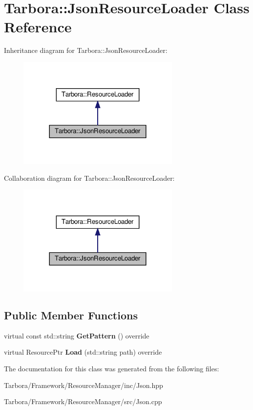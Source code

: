 \hypertarget{classTarbora_1_1JsonResourceLoader}{}\section{Tarbora\+:\+:Json\+Resource\+Loader Class Reference}
\label{classTarbora_1_1JsonResourceLoader}


Inheritance diagram for Tarbora\+:\+:Json\+Resource\+Loader\+:\nopagebreak
\begin{figure}[H]
\begin{center}
\leavevmode
\includegraphics[width=228pt]{classTarbora_1_1JsonResourceLoader__inherit__graph}
\end{center}
\end{figure}


Collaboration diagram for Tarbora\+:\+:Json\+Resource\+Loader\+:\nopagebreak
\begin{figure}[H]
\begin{center}
\leavevmode
\includegraphics[width=228pt]{classTarbora_1_1JsonResourceLoader__coll__graph}
\end{center}
\end{figure}
\subsection*{Public Member Functions}
\begin{DoxyCompactItemize}
\item 
\mbox{\label{classTarbora_1_1JsonResourceLoader_a5fffdd653db9dee36b5a0a4b7703e82b}} 
virtual const std\+::string {\bfseries Get\+Pattern} () override
\item 
\mbox{\label{classTarbora_1_1JsonResourceLoader_a04bf891a766c9f3992c9db3634fc4d20}} 
virtual Resource\+Ptr {\bfseries Load} (std\+::string path) override
\end{DoxyCompactItemize}


The documentation for this class was generated from the following files\+:\begin{DoxyCompactItemize}
\item 
Tarbora/\+Framework/\+Resource\+Manager/inc/Json.\+hpp\item 
Tarbora/\+Framework/\+Resource\+Manager/src/Json.\+cpp\end{DoxyCompactItemize}
